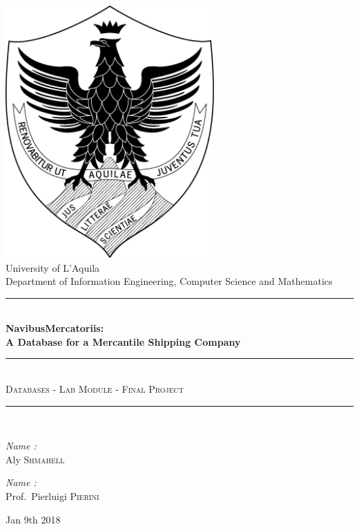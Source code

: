 \documentclass[10pt]{report}
\newcommand\tab[1][1cm]{\hspace*{#1}}
\begin{document}
	\begin{titlepage}
		\begin{center}
			\includegraphics[width=0.6\textwidth]{UnivAQ-logo}\\[1cm]
			{\LARGE University of L'Aquila}\\[0.5cm]
			{\large Department of Information Engineering, Computer Science and Mathematics}\\[0.5cm]
			\rule{\linewidth}{0.5mm} \\[0.4cm]
			{\huge \bfseries NavibusMercatoriis:\\ A Database for a Mercantile Shipping Company \\[0.4cm] }
			\rule{\linewidth}{0.5mm} \\[0.1cm]
			\noindent
			{\large  \textsc{Databases - Lab Module - Final Project}
				\vspace{-0.04cm} \\[0.01cm] }
			\rule{\linewidth}{0.5mm} \\[0.1cm]
			\noindent
			\begin{tcbraster}[raster columns=2,raster rows=1,
				enhanced,size=small,fit algorithm=hybrid* ]
				\begin{tcolorbox}[
					colback=white,
					sharp corners = northwest,
					title={Student}
					]
					\large
					\emph{Name :} \\[0.2cm]
					\tab Aly \textsc{Shmahell}\\[0.2cm]
				\end{tcolorbox}
				\begin{tcolorbox}[
					colback=white,
					sharp corners = northwest,
					title = {Supervisor}
					]
					\large
					\emph{Name :} \\[0.2cm]
					\tab Prof.~Pierluigi \textsc{Pierini}\\[0.2cm]
				\end{tcolorbox}
			\end{tcbraster}
			\vfill
			Jan 9th 2018
		\end{center}
	\end{titlepage}
\end{document}
